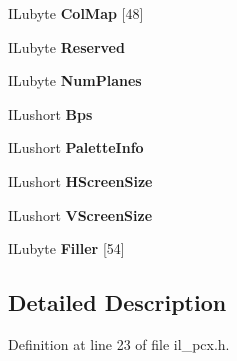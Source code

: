 \begin{DoxyCompactItemize}
\mbox{\label{structPCXHEAD_a6438015edb1a268cef89c7899c65523f}} 
I\+Lubyte {\bfseries Col\+Map} \mbox{[}48\mbox{]}
\item 
\mbox{\label{structPCXHEAD_a615b060f1fdb3f1575366e329b50cd10}} 
I\+Lubyte {\bfseries Reserved}
\item 
\mbox{\label{structPCXHEAD_a03e50e16becfa04da5fbcd6892ee65f9}} 
I\+Lubyte {\bfseries Num\+Planes}
\item 
\mbox{\label{structPCXHEAD_a12cdbf472dd1b5120f9eb84542c9d763}} 
I\+Lushort {\bfseries Bps}
\item 
\mbox{\label{structPCXHEAD_a957d8417d09471d1b44904e24290a361}} 
I\+Lushort {\bfseries Palette\+Info}
\item 
\mbox{\label{structPCXHEAD_ae1fd33522ff59e7e548182658c4e5781}} 
I\+Lushort {\bfseries H\+Screen\+Size}
\item 
\mbox{\label{structPCXHEAD_af2c190ee4274245366f9bb2cfcf4ac89}} 
I\+Lushort {\bfseries V\+Screen\+Size}
\item 
\mbox{\label{structPCXHEAD_ae9eef4cea77a2f29f1a9852093340174}} 
I\+Lubyte {\bfseries Filler} \mbox{[}54\mbox{]}
\end{DoxyCompactItemize}


\subsection{Detailed Description}


Definition at line 23 of file il\+\_\+pcx.\+h.



